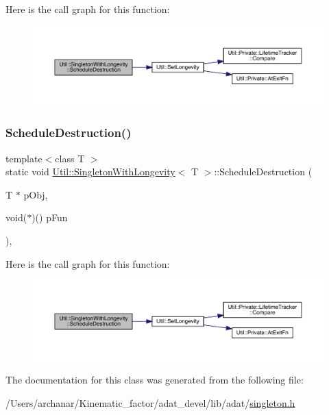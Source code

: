 Here is the call graph for this function\+:
\nopagebreak
\begin{figure}[H]
\begin{center}
\leavevmode
\includegraphics[width=350pt]{d0/de9/classUtil_1_1SingletonWithLongevity_acada28acaf9030754388818a79b0468d_cgraph}
\end{center}
\end{figure}
\mbox{\label{classUtil_1_1SingletonWithLongevity_acada28acaf9030754388818a79b0468d}} 
\subsubsection{\texorpdfstring{ScheduleDestruction()}{ScheduleDestruction()}\hspace{0.1cm}{\footnotesize\ttfamily [2/2]}}
{\footnotesize\ttfamily template$<$class T $>$ \\
static void \mbox{\hyperlink{classUtil_1_1SingletonWithLongevity}{Util\+::\+Singleton\+With\+Longevity}}$<$ T $>$\+::Schedule\+Destruction (\begin{DoxyParamCaption}\item[{T $\ast$}]{p\+Obj,  }\item[{void($\ast$)()}]{p\+Fun }\end{DoxyParamCaption})\hspace{0.3cm}{\ttfamily [inline]}, {\ttfamily [static]}}

Here is the call graph for this function\+:
\nopagebreak
\begin{figure}[H]
\begin{center}
\leavevmode
\includegraphics[width=350pt]{d0/de9/classUtil_1_1SingletonWithLongevity_acada28acaf9030754388818a79b0468d_cgraph}
\end{center}
\end{figure}


The documentation for this class was generated from the following file\+:\begin{DoxyCompactItemize}
\item 
/\+Users/archanar/\+Kinematic\+\_\+factor/adat\+\_\+devel/lib/adat/\mbox{\hyperlink{lib_2adat_2singleton_8h}{singleton.\+h}}\end{DoxyCompactItemize}
